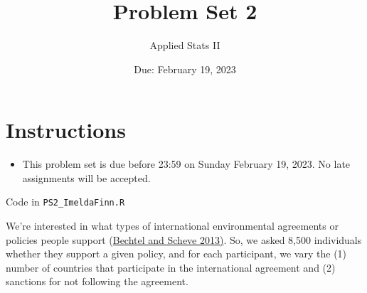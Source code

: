 \documentclass[12pt,letterpaper]{article}
\title{Problem Set 2}
\date{Due: February 19, 2023}
\author{Applied Stats II}
\begin{document}
	\maketitle
	\section*{Instructions}
	\begin{itemize}
		\item This problem set is due before 23:59 on Sunday February 19, 2023. No late assignments will be accepted.
	\end{itemize}

	
	
	Code in \texttt{PS2\_ImeldaFinn.R}

\vspace{.25cm}
\noindent We're interested in what types of international environmental agreements or policies people support (\href{https://www.pnas.org/content/110/34/13763}{Bechtel and Scheve 2013)}. So, we asked 8,500 individuals whether they support a given policy, and for each participant, we vary the (1) number of countries that participate in the international agreement and (2) sanctions for not following the agreement. \\

\end{document}

